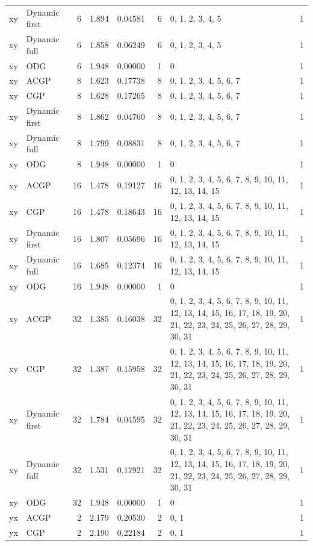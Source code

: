 \documentclass[10pt,a4paper]{article}
\begin{document}
\begin{longtable}{@{}p{23mm}p{29mm}rrrrp{36mm}r@{}}
xy & Dynamic first & 6 & 1.894 & 0.04581 & 6 & 0, 1, 2, 3, 4, 5 & 1 \\
xy & Dynamic full & 6 & 1.858 & 0.06249 & 6 & 0, 1, 2, 3, 4, 5 & 1 \\
xy & ODG & 6 & 1.948 & 0.00000 & 1 & 0 & 1 \\
xy & ACGP & 8 & 1.623 & 0.17738 & 8 & 0, 1, 2, 3, 4, 5, 6, 7 & 1 \\
xy & CGP & 8 & 1.628 & 0.17265 & 8 & 0, 1, 2, 3, 4, 5, 6, 7 & 1 \\
xy & Dynamic first & 8 & 1.862 & 0.04760 & 8 & 0, 1, 2, 3, 4, 5, 6, 7 & 1 \\
xy & Dynamic full & 8 & 1.799 & 0.08831 & 8 & 0, 1, 2, 3, 4, 5, 6, 7 & 1 \\
xy & ODG & 8 & 1.948 & 0.00000 & 1 & 0 & 1 \\
xy & ACGP & 16 & 1.478 & 0.19127 & 16 & 0, 1, 2, 3, 4, 5, 6, 7, 8, 9, 10, 11, 12, 13, 14, 15 & 1 \\
xy & CGP & 16 & 1.478 & 0.18643 & 16 & 0, 1, 2, 3, 4, 5, 6, 7, 8, 9, 10, 11, 12, 13, 14, 15 & 1 \\
xy & Dynamic first & 16 & 1.807 & 0.05696 & 16 & 0, 1, 2, 3, 4, 5, 6, 7, 8, 9, 10, 11, 12, 13, 14, 15 & 1 \\
xy & Dynamic full & 16 & 1.685 & 0.12374 & 16 & 0, 1, 2, 3, 4, 5, 6, 7, 8, 9, 10, 11, 12, 13, 14, 15 & 1 \\
xy & ODG & 16 & 1.948 & 0.00000 & 1 & 0 & 1 \\
xy & ACGP & 32 & 1.385 & 0.16038 & 32 & 0, 1, 2, 3, 4, 5, 6, 7, 8, 9, 10, 11, 12, 13, 14, 15, 16, 17, 18, 19, 20, 21, 22, 23, 24, 25, 26, 27, 28, 29, 30, 31 & 1 \\
xy & CGP & 32 & 1.387 & 0.15958 & 32 & 0, 1, 2, 3, 4, 5, 6, 7, 8, 9, 10, 11, 12, 13, 14, 15, 16, 17, 18, 19, 20, 21, 22, 23, 24, 25, 26, 27, 28, 29, 30, 31 & 1 \\
xy & Dynamic first & 32 & 1.784 & 0.04595 & 32 & 0, 1, 2, 3, 4, 5, 6, 7, 8, 9, 10, 11, 12, 13, 14, 15, 16, 17, 18, 19, 20, 21, 22, 23, 24, 25, 26, 27, 28, 29, 30, 31 & 1 \\
xy & Dynamic full & 32 & 1.531 & 0.17921 & 32 & 0, 1, 2, 3, 4, 5, 6, 7, 8, 9, 10, 11, 12, 13, 14, 15, 16, 17, 18, 19, 20, 21, 22, 23, 24, 25, 26, 27, 28, 29, 30, 31 & 1 \\
xy & ODG & 32 & 1.948 & 0.00000 & 1 & 0 & 1 \\
yx & ACGP & 2 & 2.179 & 0.20530 & 2 & 0, 1 & 1 \\
yx & CGP & 2 & 2.190 & 0.22184 & 2 & 0, 1 & 1 \\

\end{longtable}
\end{document}
